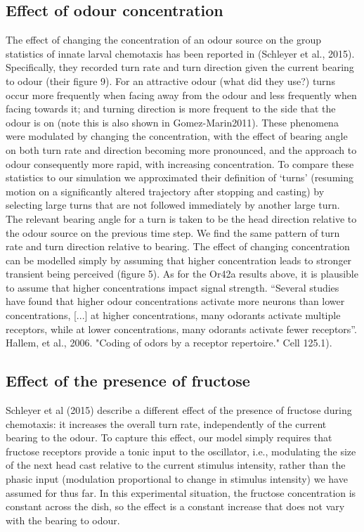 \documentclass[10pt,a4paper]{article}
\begin{document}
\subsection{Effect of odour concentration}
The effect of changing the concentration of an odour source on the group statistics of innate larval chemotaxis has been reported in (Schleyer et al., 2015). Specifically, they recorded turn rate and turn direction given the current bearing to odour (their figure 9). For an attractive odour (what did they use?) turns occur more frequently when facing away from the odour and less frequently when facing towards it; and turning direction is more frequent to the side that the odour is on (note this is also shown in Gomez-Marin2011). These phenomena were modulated by changing the concentration, with the effect of bearing angle on both turn rate and direction becoming more pronounced, and the approach to odour consequently more rapid, with increasing concentration.
 To compare these statistics to our simulation we approximated their definition of ‘turns’ (resuming motion on a significantly altered trajectory after stopping and casting) by
 selecting large turns that are not followed
 immediately by another large turn.
 The relevant bearing angle for a turn is taken to be the head direction relative to the odour source on the previous time step. We find the same pattern of turn rate and turn direction relative to bearing. The effect of changing concentration can be modelled simply by assuming that higher concentration leads to stronger transient being perceived (figure 5). As for the Or42a results above, it is plausible to assume that higher concentrations impact signal strength.  “Several studies have found that higher odour concentrations activate more neurons than lower concentrations, [...] at higher concentrations, many odorants activate multiple receptors, while at lower concentrations, many odorants activate fewer receptors”. Hallem, et al., 2006. "Coding of odors by a receptor repertoire." Cell 125.1).

\subsection{Effect of the presence of fructose}
Schleyer et al (2015) describe a different effect of the presence of fructose during chemotaxis: it increases the overall turn rate, independently of the current bearing to the odour. To capture this effect, our model simply requires that fructose receptors provide a tonic input to the oscillator, i.e., modulating the size of the next head cast relative to the current stimulus intensity, rather than the phasic input (modulation proportional to change in stimulus intensity) we have assumed for thus far. In this experimental situation, the fructose concentration is constant across the dish, so the effect is a constant increase that does not vary with the bearing to odour.
\end{document}
